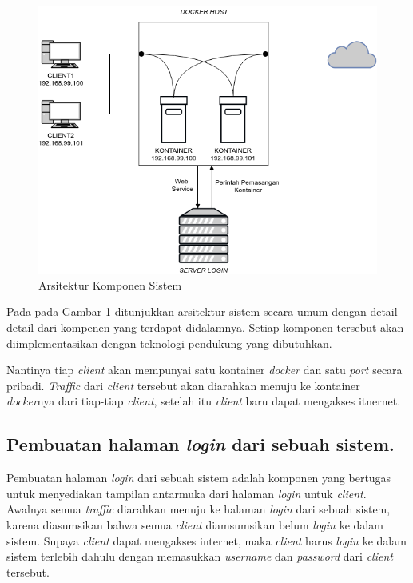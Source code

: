       \begin{figure}[H]
        \centering
        \includegraphics[width=\linewidth]{images/bab3/DIAGRAM1}
        \caption{Arsitektur Komponen Sistem}
        \label{Arsitektur Komponen Sistem}
      \end{figure}
      
    \indent Pada pada Gambar \ref{Arsitektur Komponen Sistem} ditunjukkan arsitektur sistem secara umum dengan detail-detail dari kompenen yang terdapat didalamnya. Setiap komponen tersebut akan diimplementasikan dengan teknologi pendukung yang dibutuhkan.
    
    Nantinya tiap \textit{client}  akan mempunyai satu kontainer \textit{docker} dan satu \textit{port} secara pribadi. \textit{Traffic} dari \textit{client} tersebut akan diarahkan menuju ke kontainer \textit{docker}nya dari tiap-tiap \textit{client}, setelah itu \textit{client} baru dapat mengakses itnernet.
    
    \subsection{Pembuatan halaman \textit{login} dari sebuah sistem.}
    Pembuatan halaman \textit{login} dari sebuah sistem adalah komponen yang bertugas untuk menyediakan tampilan antarmuka dari halaman \textit{login} untuk \textit{client}. Awalnya semua \textit{traffic} diarahkan menuju ke halaman \textit{login} dari sebuah sistem, karena diasumsikan bahwa semua \textit{client} diamsumsikan belum \textit{login} ke dalam sistem. Supaya \textit{client} dapat mengakses internet, maka \textit{client} harus \textit{login} ke dalam sistem terlebih dahulu dengan memasukkan \textit{username} dan \textit{password} dari \textit{client} tersebut.
    
